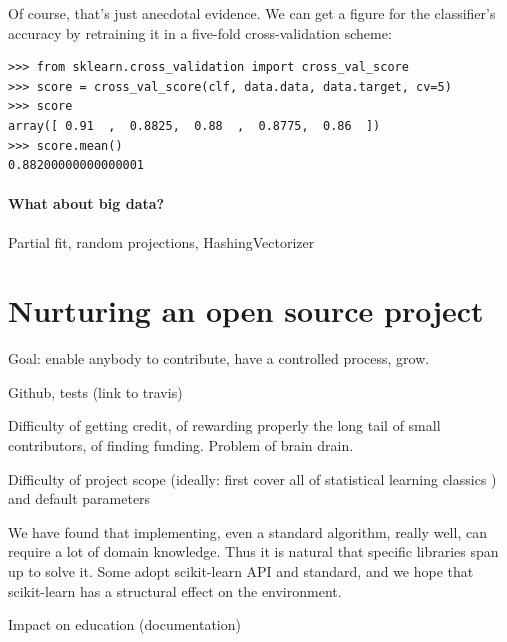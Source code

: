 \documentclass[a4paper]{article}
\begin{document}
Of course, that's just anecdotal evidence. We can get a figure for the
classifier's accuracy by retraining it in a five-fold cross-validation scheme:

\begin{lstlisting}
>>> from sklearn.cross_validation import cross_val_score
>>> score = cross_val_score(clf, data.data, data.target, cv=5)
>>> score
array([ 0.91  ,  0.8825,  0.88  ,  0.8775,  0.86  ])
>>> score.mean()
0.88200000000000001
\end{lstlisting}

\paragraph{What about big data?}
%
Partial fit, random projections, HashingVectorizer

\section{Nurturing an open source project}

Goal: enable anybody to contribute, have a controlled process, grow.

Github, tests (link to travis)

Difficulty of getting credit, of rewarding properly the long tail of small
contributors, of finding funding. Problem of brain drain.

Difficulty of project scope (ideally: first cover all of statistical
learning classics \cite{elemstatlearn}) and default parameters

We have found that implementing, even a standard algorithm, really well,
can require a lot of domain knowledge. Thus it is natural that specific
libraries span up to solve it. Some adopt scikit-learn API and standard,
and we hope that scikit-learn has a structural effect on the environment.

Impact on education (documentation)

\small


\end{document}
